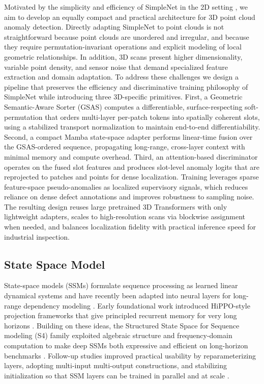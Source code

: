 Motivated by the simplicity and efficiency of SimpleNet in the 2D setting \cite{liu2023simplenet}, we aim to develop an equally compact and practical architecture for 3D point cloud anomaly detection. Directly adapting SimpleNet to point clouds is not straightforward because point clouds are unordered and irregular, and because they require permutation-invariant operations and explicit modeling of local geometric relationships. In addition, 3D scans present higher dimensionality, variable point density, and sensor noise that demand specialized feature extraction and domain adaptation. To address these challenges we design a pipeline that preserves the efficiency and discriminative training philosophy of SimpleNet while introducing three 3D-specific primitives. First, a Geometric Semantic-Aware Sorter (GSAS) computes a differentiable, surface-respecting soft-permutation that orders multi-layer per-patch tokens into spatially coherent slots, using a stabilized transport normalization to maintain end-to-end differentiability. Second, a compact Mamba state-space adapter performs linear-time fusion over the GSAS-ordered sequence, propagating long-range, cross-layer context with minimal memory and compute overhead. Third, an attention-based discriminator operates on the fused slot features and produces slot-level anomaly logits that are reprojected to patches and points for dense localization. Training leverages sparse feature-space pseudo-anomalies as localized supervisory signals, which reduces reliance on dense defect annotations and improves robustness to sampling noise. The resulting design reuses large pretrained 3D Transformers with only lightweight adapters, scales to high-resolution scans via blockwise assignment when needed, and balances localization fidelity with practical inference speed for industrial inspection.

\subsection{State Space Model}

State-space models (SSMs) formulate sequence processing as learned linear dynamical systems and have recently been adapted into neural layers for long-range dependency modeling \cite{gu2020hippo,gu2021efficiently,gu2021combining,gu2022parameterization,smith2022simplified}.  Early foundational work introduced HiPPO-style projection frameworks that give principled recurrent memory for very long horizons \cite{gu2020hippo}.  Building on these ideas, the Structured State Space for Sequence modeling (S4) family exploited algebraic structure and frequency-domain computation to make deep SSMs both expressive and efficient on long-horizon benchmarks \cite{gu2021efficiently}. Follow-up studies improved practical usability by reparameterizing layers, adopting multi-input multi-output constructions, and stabilizing initialization so that SSM layers can be trained in parallel and at scale \cite{gu2021combining,gu2022parameterization,smith2022simplified}.

